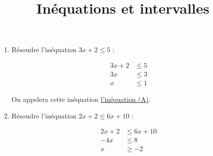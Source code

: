 \documentclass[
	classe=$2^{de}$,
	exercices=Chapitre\space 2
]{exercice}
\title{Inéquations et intervalles}
\author{}
\date{}
\begin{document}
\maketitle

\begin{enumerate}
	\item Résoudre l'inéquation $3x + 2 ≤ 5$ :

	      \ifdefined\makeCorrection
		      {\color{red}\begin{align*}
				      3x + 2 & ≤ 5 \\
				      3x     & ≤ 3 \\
				      x      & ≤ 1
			      \end{align*}}
	      \else
		      \vspace{8em}
	      \fi

	      On appelera cette inéquation \uline{l'inéquation (A)}.
	\item Résoudre l'inéquation $2x + 2 ≤ 6x + 10$ :

	      \ifdefined\makeCorrection
		      {\color{red}\begin{align*}
				      2x + 2 & ≤ 6x + 10 \\
				      -4x    & ≤ 8       \\
				      x      & ≥ -2
			      \end{align*}}
	      \else
		      \vspace{8em}
	      \fi


\end{enumerate}
\end{document}
